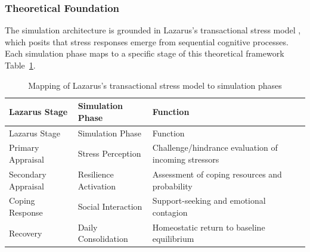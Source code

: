 \documentclass[
  letterpaper,
  DIV=11,
  numbers=noendperiod]{scrartcl}
\begin{document}
\subsubsection{Theoretical Foundation}\label{theoretical-foundation}

The simulation architecture is grounded in Lazarus's transactional
stress model \citep{folkman2020stress}, which posits that stress
responses emerge from sequential cognitive processes. Each simulation
phase maps to a specific stage of this theoretical framework
Table~\ref{tbl-lazarus-mapping}.

\begin{longtable}[]{@{}
  >{\raggedright\arraybackslash}p{}
  >{\raggedright\arraybackslash}p{}
  >{\raggedright\arraybackslash}p{}@{}}
\caption{Mapping of Lazarus's transactional stress model to simulation
phases}\label{tbl-lazarus-mapping}\tabularnewline
\toprule\noalign{}
\begin{minipage}[b]{\linewidth}\raggedright
Lazarus Stage
\end{minipage} & \begin{minipage}[b]{\linewidth}\raggedright
Simulation Phase
\end{minipage} & \begin{minipage}[b]{\linewidth}\raggedright
Function
\end{minipage} \\
\midrule\noalign{}
\endfirsthead
\toprule\noalign{}
\begin{minipage}[b]{\linewidth}\raggedright
Lazarus Stage
\end{minipage} & \begin{minipage}[b]{\linewidth}\raggedright
Simulation Phase
\end{minipage} & \begin{minipage}[b]{\linewidth}\raggedright
Function
\end{minipage} \\
\midrule\noalign{}
\endhead
\bottomrule\noalign{}
\endlastfoot
Primary Appraisal & Stress Perception & Challenge/hindrance evaluation
of incoming stressors \\
Secondary Appraisal & Resilience Activation & Assessment of coping
resources and probability \\
Coping Response & Social Interaction & Support-seeking and emotional
contagion \\
Recovery & Daily Consolidation & Homeostatic return to baseline
equilibrium \\
\end{longtable}
\end{document}
